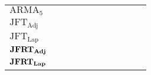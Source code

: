 \documentclass[a4paper, 12pt]{article}
\begin{document}
\begin{table}[ht]
{\begin{tabular}{@{}llrrrrrrrrr@{}}
			\(\text{ARMA}_5\)                              &                                       &                               &                               &                                &          &          &          &          &          &          \\
			\(\text{JFT}_{\text{Adj}}\)                    &                                       &                               &                               &                                &          &          &          &          &          &          \\
			\(\text{JFT}_{\text{Lap}}\)                    &                                       &                               &                               &                                &          &          &          &          &          &          \\
			\(\text{\textbf{JFRT}}_{\text{\textbf{Adj}}}\) &                                       &                               &                               &                                &          &          &          &          &          &          \\
			\(\text{\textbf{JFRT}}_{\text{\textbf{Lap}}}\) &                                       &                               &                               &                                &          &          &          &          &          &          \\ \bottomrule
		\end{tabular}
	}
\end{table}
\end{document}
